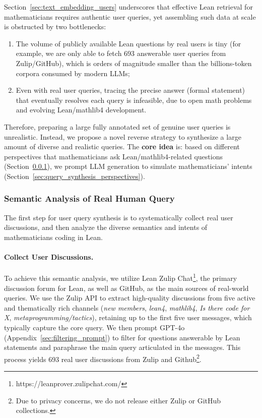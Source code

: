 \documentclass{article} %
\begin{document}
Section~\ref{sec:text_embedding_users} underscores that effective Lean retrieval for mathematicians requires authentic user queries,
yet assembling such data at scale is obstructed by two bottlenecks:
\begin{enumerate}[leftmargin=*]%
    \item
The volume of publicly available Lean questions by real users is tiny (for example, we are only able to fetch 693 answerable user queries from Zulip/GitHub), which is orders of magnitude smaller than the billions-token corpora consumed by modern LLMs;
    \item
Even with real user queries, tracing the precise answer (formal statement) that eventually resolves each query is infeasible, due to open math problems and evolving Lean/mathlib4 development. 
\end{enumerate}
Therefore, preparing a large fully annotated set of genuine user queries is unrealistic.
% 
Instead, we propose a novel reverse strategy to synthesize a large amount of diverse and realistic queries.
% 
The \textbf{core idea} is: based on different perspectives that mathematicians ask Lean/mathlib4-related questions (Section~\ref{sec:semantic_analysis_user_query}), we prompt LLM generation to simulate mathematicians' intents (Section~\ref{sec:query_synthesis_perspectives}).


\subsubsection{Semantic Analysis of Real Human Query}
\label{sec:semantic_analysis_user_query}



The first step for user query synthesis is to
systematically collect real user discussions,
and then analyze the diverse semantics and intents
of mathematicians coding in Lean.

\vspace{-0.5em}
\paragraph{Collect User Discussions.}

To achieve this semantic analysis, we utilize Lean Zulip Chat\footnote{https://leanprover.zulipchat.com/}, the primary discussion forum for Lean, as well as GitHub, as the main sources of real-world queries.
We use the Zulip API to extract high-quality discussions from five active and thematically rich channels (\textit{new members}, \textit{lean4}, \textit{mathlib4}, \textit{Is there code for X}, \textit{metaprogramming/tactics}), retaining up to the first five user messages, which typically capture the core query. We then prompt GPT-4o (Appendix~\ref{sec:filtering_prompt}) to filter for questions answerable by Lean statements and paraphrase the main query articulated in the messages. This process yields 693 real user discussions from Zulip and Github\footnote{Due to privacy concerns, we do not release either Zulip or GitHub collections.}.
\end{document}
